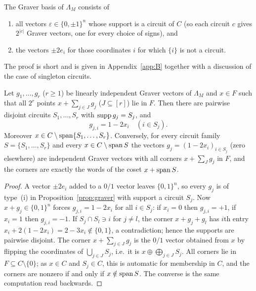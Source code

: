 \begin{proposition}\label{prop:graver}
The Graver basis of $\Lambda_M$ consists of
\begin{enumerate}[label=(\roman*)]
\item all vectors $\varepsilon\in\{0,\pm1\}^n$ whose support is a circuit of $C$ (so each circuit $c$ gives $2^{|c|}$ Graver vectors, one for every choice of signs), and
\item the vectors $\pm2e_i$ for those coordinates $i$ for which $\{i\}$ is not a circuit.
\end{enumerate}
\end{proposition}

The proof is short and is given in Appendix~\ref{app:B} together with a discussion of the case of singleton circuits.

\begin{proposition}\label{prop:cells}
Let $g_1,\dots,g_r$ ($r\ge1$) be linearly independent Graver vectors of $\Lambda_M$ and $x\in F$ such that all $2^r$ points $x+\sum_{j\in J}g_j$ ($J\subseteq[r]$) lie in $F$. Then there are pairwise disjoint circuits $S_1,\dots,S_r$ with $\operatorname{supp} g_j=S_j$, and
\[
g_{j,i}=1-2x_i\quad (i\in S_j).
\]
Moreover $x\in C\setminus\operatorname{span}\{S_1,\dots,S_r\}$. Conversely, for every circuit family $S=\{S_1,\dots,S_r\}$ and every $x\in C\setminus\operatorname{span} S$ the vectors $g_j=(1-2x_i)_{i\in S_j}$ (zero elsewhere) are independent Graver vectors with all corners $x+\sum_Jg_j$ in $F$, and the corners are exactly the words of the coset $x+\operatorname{span} S$.
\end{proposition}

\begin{proof}
A vector $\pm2e_i$ added to a $0/1$ vector leaves $\{0,1\}^n$, so every $g_j$ is of type~(i) in Proposition~\ref{prop:graver} with support a circuit $S_j$. Now $x+g_j\in\{0,1\}^n$ forces $g_{j,i}=1-2x_i$ for all $i\in S_j$: if $x_i=0$ then $g_{j,i}=+1$, if $x_i=1$ then $g_{j,i}=-1$. If $S_j\cap S_l\ni i$ for $j\ne l$, the corner $x+g_j+g_l$ has $i$th entry $x_i+2(1-2x_i)=2-3x_i\notin\{0,1\}$, a contradiction; hence the supports are pairwise disjoint. The corner $x+\sum_{j\in J}g_j$ is the $0/1$ vector obtained from $x$ by flipping the coordinates of $\bigcup_{j\in J}S_j$, i.e.\ it is $x\oplus\bigoplus_{j\in J}S_j$. All corners lie in $F\subseteq C\setminus\{0\}$; as $x\in C$ and $S_j\in C$, this is automatic for membership in $C$, and the corners are nonzero if and only if $x\notin\operatorname{span} S$. The converse is the same computation read backwards.
\end{proof}

